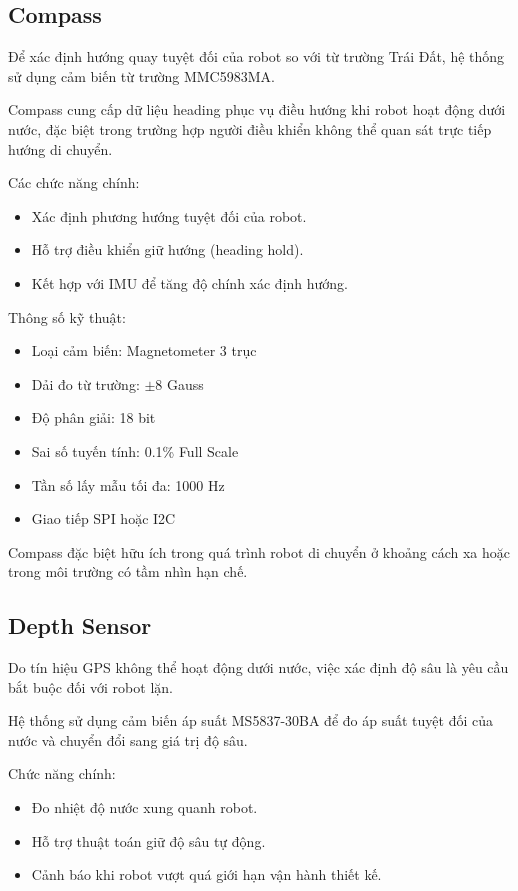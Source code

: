 \documentclass[../DoAn.tex]{subfiles}
\begin{document}
\subsection{Compass}

Để xác định hướng quay tuyệt đối của robot so với từ trường Trái Đất, hệ thống sử dụng cảm biến từ trường MMC5983MA.

Compass cung cấp dữ liệu heading phục vụ điều hướng khi robot hoạt động dưới nước, đặc biệt trong trường hợp người điều khiển không thể quan sát trực tiếp hướng di chuyển.

Các chức năng chính:

\begin{itemize}
    \item Xác định phương hướng tuyệt đối của robot.
    \item Hỗ trợ điều khiển giữ hướng (heading hold).
    \item Kết hợp với IMU để tăng độ chính xác định hướng.
\end{itemize}

Thông số kỹ thuật:

\begin{itemize}
    \item Loại cảm biến: Magnetometer 3 trục
    \item Dải đo từ trường: $\pm8$ Gauss
    \item Độ phân giải: 18 bit
    \item Sai số tuyến tính: 0.1\% Full Scale
    \item Tần số lấy mẫu tối đa: 1000 Hz
    \item Giao tiếp SPI hoặc I2C
\end{itemize}

Compass đặc biệt hữu ích trong quá trình robot di chuyển ở khoảng cách xa hoặc trong môi trường có tầm nhìn hạn chế.

\subsection{Depth Sensor}

Do tín hiệu GPS không thể hoạt động dưới nước, việc xác định độ sâu là yêu cầu bắt buộc đối với robot lặn.

Hệ thống sử dụng cảm biến áp suất MS5837-30BA để đo áp suất tuyệt đối của nước và chuyển đổi sang giá trị độ sâu.

Chức năng chính:

\begin{itemize}
    \item Đo nhiệt độ nước xung quanh robot.
    \item Hỗ trợ thuật toán giữ độ sâu tự động.
    \item Cảnh báo khi robot vượt quá giới hạn vận hành thiết kế.
\end{itemize}
\end{document}
